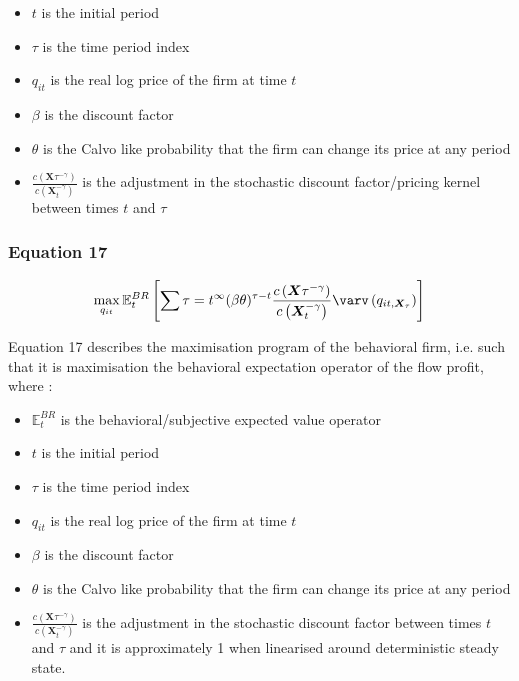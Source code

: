 \documentclass{article}
\begin{document}
\begin{itemize}
    \item $t$ is the initial period 
    \item $\tau$ is the time period index  
    \item $q_{it}$ is the real log price of the firm at time $t$
    \item $\beta$ is the discount factor
    \item $\theta$ is the Calvo like probability that the firm can change its price at any period
    \item $\frac{c\left(\bm{X}{\tau}^{-\gamma}\right)}{c\left(\bm{X}_{t}^{-\gamma}\right)}$ is the adjustment in the stochastic discount factor/pricing kernel between times $t$ and $\tau$ 
\end{itemize}

\subsubsection*{Equation 17}
\begin{equation}
    \max_{q_{it}}{\mathbb{E}_{t}^{BR} \left[\sum{\tau=t}^{\infty}(\beta\theta)^{\tau-t}\frac{c\left(\bm{X}{\tau}^{-\gamma}\right)}{c\left(\bm{X}_{t}^{-\gamma}\right)} \varv\left(q_{it,\bm{X}_{\tau}}\right) \right]}
\end{equation}

Equation 17 describes the maximisation program of the behavioral firm, i.e. such that it is maximisation the behavioral expectation operator of the flow profit, where : 
\begin{itemize}
    \item $\mathbb{E}_{t}^{BR}$ is the behavioral/subjective expected value operator 
    \item $t$ is the initial period 
    \item $\tau$ is the time period index  
    \item $q_{it}$ is the real log price of the firm at time $t$
    \item $\beta$ is the discount factor
    \item $\theta$ is the Calvo like probability that the firm can change its price at any period
    \item $\frac{c\left(\bm{X}{\tau}^{-\gamma}\right)}{c\left(\bm{X}_{t}^{-\gamma}\right)}$ is the adjustment in the stochastic discount factor between times $t$ and $\tau$ and it is approximately 1 when linearised around deterministic steady state. 
\end{itemize}
\end{document}
